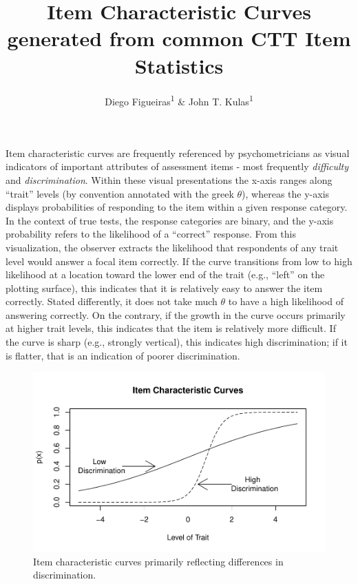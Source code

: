 \documentclass[
  english,
  man]{apa6}
\title{Item Characteristic Curves generated from common CTT Item Statistics}
\author{Diego Figueiras\textsuperscript{1} \& John T. Kulas\textsuperscript{1}}
\date{}
\affiliation{\vspace{0.5cm}\textsuperscript{1} Montclair State University}
\begin{document}
\maketitle

Item characteristic curves are frequently referenced by psychometricians as visual indicators of important attributes of assessment items - most frequently \emph{difficulty} and \emph{discrimination}. Within these visual presentations the x-axis ranges along ``trait'' levels (by convention annotated with the greek \(\theta\)), whereas the y-axis displays probabilities of responding to the item within a given response category. In the context of true tests, the response categories are binary, and the y-axis probability refers to the likelihood of a ``correct'' response. From this visualization, the observer extracts the likelihood that respondents of any trait level would answer a focal item correctly. If the curve transitions from low to high likelihood at a location toward the lower end of the trait (e.g., ``left'' on the plotting surface), this indicates that it is relatively easy to answer the item correctly. Stated differently, it does not take much \(\theta\) to have a high likelihood of answering correctly. On the contrary, if the growth in the curve occurs primarily at higher trait levels, this indicates that the item is relatively more difficult. If the curve is sharp (e.g., strongly vertical), this indicates high discrimination; if it is flatter, that is an indication of poorer discrimination.

\begin{figure}
\centering
\includegraphics{ICC_project_files/figure-latex/unnamed-chunk-1-1.pdf}
\caption{\label{fig:unnamed-chunk-1}Item characteristic curves primarily reflecting differences in discrimination.}
\end{figure}
\end{document}
